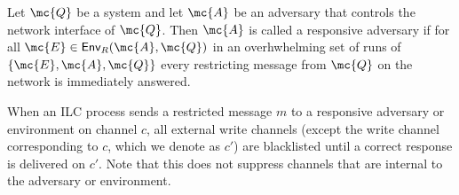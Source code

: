 \begin{definition}
  Let $\mc{Q}$ be a system and let $\mc{A}$ be an adversary that controls the
  network interface of $\mc{Q}$. Then $\mc{A}$ is called a responsive adversary
  if for all $\mc{E} \in \textsf{Env}_R(\mc{A}, \mc{Q})$ in an overhwhelming set
  of runs of $\{\mc{E}, \mc{A}, \mc{Q}\}$ every restricting message from
  $\mc{Q}$ on the network is immediately answered.
\end{definition}

 When an ILC process sends a restricted
message $m$ to a responsive adversary or environment on channel $c$, all
external write channels (except the write channel corresponding to $c$, which we
denote as $c'$) are blacklisted until a correct response is delivered on
$c'$. Note that this does not suppress channels that are internal to the
adversary or environment.
